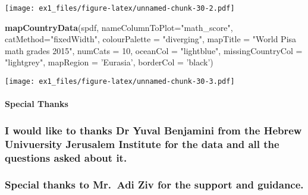 \documentclass[]{article}
\newenvironment{Shaded}{\begin{snugshade}}{\end{snugshade}}
\newcommand{\KeywordTok}[1]{\textcolor[rgb]{0.13,0.29,0.53}{\textbf{#1}}}
\newcommand{\DataTypeTok}[1]{\textcolor[rgb]{0.13,0.29,0.53}{#1}}
\newcommand{\DecValTok}[1]{\textcolor[rgb]{0.00,0.00,0.81}{#1}}
\newcommand{\StringTok}[1]{\textcolor[rgb]{0.31,0.60,0.02}{#1}}
\newcommand{\NormalTok}[1]{#1}
\let\oldparagraph\paragraph
\renewcommand{\paragraph}[1]{\oldparagraph{#1}\mbox{}}
\begin{document}
\texttt{[image: ex1\_files/figure-latex/unnamed-chunk-30-2.pdf]}

\begin{Shaded}
\begin{Highlighting}[]
\KeywordTok{mapCountryData}\NormalTok{(spdf, }\DataTypeTok{nameColumnToPlot=}\StringTok{"math_score"}\NormalTok{, }\DataTypeTok{catMethod=}\StringTok{"fixedWidth"}\NormalTok{, }\DataTypeTok{colourPalette =} \StringTok{"diverging"}\NormalTok{, }\DataTypeTok{mapTitle =} \StringTok{"World Pisa math grades 2015"}\NormalTok{, }\DataTypeTok{numCats =} \DecValTok{10}\NormalTok{, }\DataTypeTok{oceanCol =} \StringTok{"lightblue"}\NormalTok{, }\DataTypeTok{missingCountryCol =} \StringTok{"lightgrey"}\NormalTok{, }\DataTypeTok{mapRegion =} \StringTok{'Eurasia'}\NormalTok{, }\DataTypeTok{borderCol =} \StringTok{'black'}\NormalTok{)}
\end{Highlighting}
\end{Shaded}

\texttt{[image: ex1\_files/figure-latex/unnamed-chunk-30-3.pdf]}

\paragraph{Special Thanks}\label{special-thanks}

\subsubsection{I would like to thanks Dr Yuval Benjamini from the Hebrew
Univuersity Jerusalem Institute for the data and all the questions asked
about
it.}\label{i-would-like-to-thanks-dr-yuval-benjamini-from-the-hebrew-univuersity-jerusalem-institute-for-the-data-and-all-the-questions-asked-about-it.}

\subsubsection{Special thanks to Mr.~Adi Ziv for the support and
guidance.}\label{special-thanks-to-mr.adi-ziv-for-the-support-and-guidance.}
\end{document}

